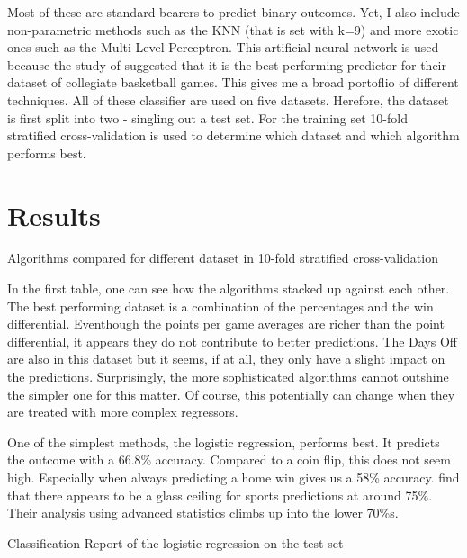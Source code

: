 \documentclass[11pt, a4paper, leqno]{article}
\begin{document}
Most of these are standard bearers to predict binary outcomes. Yet, I also include non-parametric methods such as the KNN (that is set with k=9) and more exotic ones such as the Multi-Level Perceptron. This artificial neural network is used because the study of \cite{Zimbo} suggested that it is the best performing predictor for their dataset of collegiate basketball games. This gives me a broad portoflio of different techniques. All of these classifier are used on five datasets. Herefore, the dataset is first split into two - singling out a test set. For the training set 10-fold stratified cross-validation is used to determine which dataset and which algorithm performs best.

\section{Results}

\begin{table}

\caption{Algorithms compared for different dataset in 10-fold stratified cross-validation}
    

 \end{table}

In the first table, one can see how the algorithms stacked up against each other. The best performing dataset is a combination of the percentages and the win differential. Eventhough the points per game averages are richer than the point differential, it appears they do not contribute to better predictions. The Days Off are also in this dataset but it seems, if at all, they only have a slight impact on the predictions. Surprisingly, the more sophisticated algorithms cannot outshine the simpler one for this matter. Of course, this potentially can change when they are treated with more complex regressors.

One of the simplest methods, the logistic regression, performs best. It predicts the outcome with a 66.8\% accuracy. Compared to a coin flip, this does not seem high. Especially when always predicting a home win gives us a 58\% accuracy. \citet{Zimbo} find that there appears to be a glass ceiling for sports predictions at around 75\%. Their analysis using advanced statistics climbs up into the lower 70\%s.

\begin{table}

\caption{Classification Report of the logistic regression on the test set}
\centering
    

   \end{table}
\end{document}
